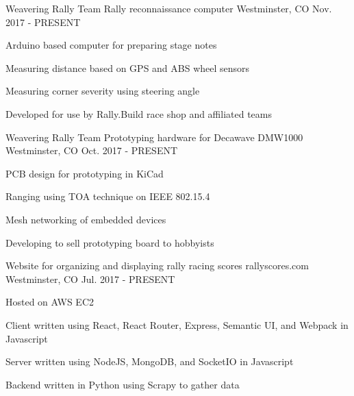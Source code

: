 

\begin{cventries}

  \cventry
    {Weavering Rally Team}
    {Rally reconnaissance computer}
    {Westminster, CO} %
    {Nov. 2017 - PRESENT} %
    {
      \begin{cvitems} %
        \item {Arduino based computer for preparing stage notes}
        \item {Measuring distance based on GPS and ABS wheel sensors}
        \item {Measuring corner severity using steering angle}
        \item {Developed for use by Rally.Build race shop and affiliated teams}
      \end{cvitems}
    }

  \cventry
    {Weavering Rally Team}
    {Prototyping hardware for Decawave DMW1000}
    {Westminster, CO} %
    {Oct. 2017 - PRESENT} %
    {
      \begin{cvitems} %
        \item {PCB design for prototyping in KiCad}
        \item {Ranging using TOA technique on IEEE 802.15.4}
        \item {Mesh networking of embedded devices}
        \item {Developing to sell prototyping board to hobbyists}
      \end{cvitems}
    }

  \cventry
    {Website for organizing and displaying rally racing scores}
    {rallyscores.com}
    {Westminster, CO} %
    {Jul. 2017 - PRESENT} %
    {
      \begin{cvitems} %
        \item {Hosted on AWS EC2}
        \item {Client written using React, React Router, Express, Semantic UI, and Webpack in Javascript}
        \item {Server written using NodeJS, MongoDB, and SocketIO in Javascript}
        \item {Backend written in Python using Scrapy to gather data}
      \end{cvitems}
    }


\end{cventries}
